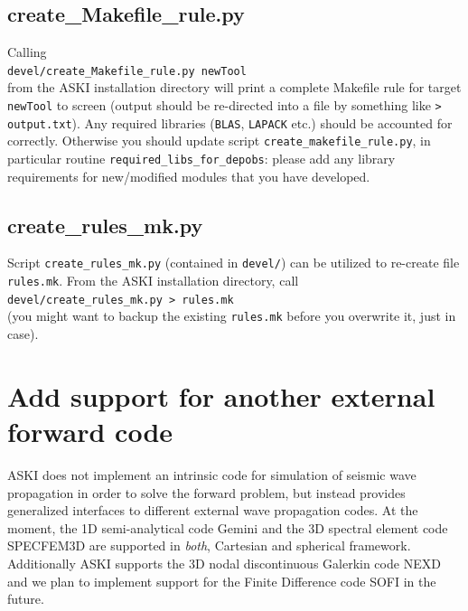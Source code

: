 \documentclass[12pt,a4paper]{article}
\newcommand{\lcode}[1]{\nolinkurl{#1}}
\newcommand{\lcodetitle}[1]{ {\ttfamily #1} }
\newcommand{\ASKI}{ {\ttfamily ASKI} }
\begin{document}
\subsection{\lcodetitle{create\_Makefile\_rule.py}} \label{ssec-devel_tools:create_Makefile_rule.py}
Calling\\
\lcode{devel/create_Makefile_rule.py newTool}\\
from the \ASKI{} installation directory will print a complete Makefile rule for target \lcode{newTool}
to screen (output should be re-directed into a file by something like \lcode{> output.txt}).
Any required libraries (\lcode{BLAS}, \lcode{LAPACK} etc.) should be accounted for correctly.
Otherwise you should update script \lcode{create_makefile_rule.py}, in particular routine 
\lcode{required_libs_for_depobs}: please add any library requirements for new/modified modules that you have
developed.

\subsection{\lcodetitle{create\_rules\_mk.py}} \label{ssec-devel_tools:create_rules_mk.py}
Script \lcode{create_rules_mk.py} (contained in \lcode{devel/}) can be utilized to re-create file 
\lcode{rules.mk}. From the \ASKI{} installation directory, call\\
\lcode{devel/create_rules_mk.py > rules.mk}\\
(you might want to backup the existing \lcode{rules.mk} before you overwrite it, just in case).


%
\section{Add support for another external forward code} \label{sec:extend_forward_code}
%
\ASKI{} does not implement an intrinsic code for simulation of seismic wave propagation in order to 
solve the forward problem, but instead provides generalized interfaces to different external wave 
propagation codes. At the moment, the 1D semi-analytical code Gemini \cite{friederich_wd1995} and the 3D spectral 
element code SPECFEM3D \cite{TrKoLi08} are supported in \emph{both}, Cartesian and spherical framework. 
Additionally \ASKI{} supports the 3D nodal discontinuous Galerkin code NEXD \cite{Lambrecht.2015}
and we plan to implement support for the Finite Difference code SOFI \cite{bohlen2002parallel}
in the future. 
\end{document}
